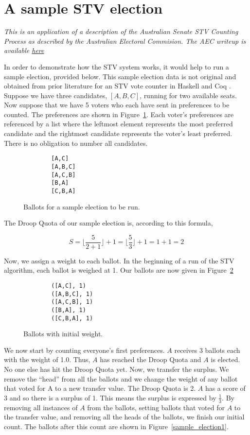 \section{A sample STV election}
\textit{This is an application of a description of the Australian Senate STV
Counting Process as described by the Australian Electoral Commision. The AEC
writeup is available
\href{https://www.aec.gov.au/Voting/counting/senate_count.htm}{here}}

In order to demonstrate how the STV system works, it would help to run a sample
election, provided below. This sample election data is not original and obtained
from prior literature for an STV vote counter in Haskell and Coq
\cite{stv_haskell}. Suppose we have three candidates, $[A, B, C]$, running for
two available seats. Now suppose that we have 5 voters who each have sent in
preferences to be counted. The preferences are shown in
Figure~\ref{sample_election}. Each voter's preferences are referenced by a list
where the leftmost element represents the most preferred candidate and the
rightmost candidate represents the voter's least preferred. There is no
obligation to number all candidates. 


\begin{figure}[ht!!!!!!!!]
    \caption{Ballots for a sample election to be run. }
    \label{sample_election}
    \begin{lstlisting}
        [A,C]
        [A,B,C]
        [A,C,B]
        [B,A]
        [C,B,A]
    \end{lstlisting}
\end{figure}

The Droop Quota of our sample election is, according to this formula, 

$$
S = \lfloor\frac{5}{2 + 1}\rfloor + 1 = \lfloor\frac{5}{3}\rfloor + 1 = 1 + 1 = 2
$$

Now, we assign a weight to each ballot. In the beginning of a run of the STV
algorithm, each ballot is weighed at 1. Our ballots are now given in
Figure~\ref{sample_election0}

\begin{figure}[ht!!!!!!!!]
    \caption{Ballots with initial weight.}
    \label{sample_election0}
    \begin{lstlisting}
        ([A,C], 1)
        ([A,B,C], 1)
        ([A,C,B], 1)
        ([B,A], 1)
        ([C,B,A], 1)
    \end{lstlisting}
\end{figure}

We now start by counting everyone's first preferences. $A$ receives 3 ballots
each with the weight of 1.0. Thus, $A$ has reached the Droop Quota and $A$ is
elected. No one else has hit the Droop Quota yet. Now, we transfer the surplus.
We remove the ``head'' from all the ballots and we change the weight of any
ballot that voted for A to a new transfer value. The Droop Quota is 2. $A$ has a
score of 3 and so there is a surplus of 1. This means the surplus is expressed
by $\frac{1}{3}$. By removing all instances of $A$ from the ballots, setting
ballots that voted for $A$ to the transfer value, and removing all the heads of
the ballots, we finish our initial count. The ballots after this count are shown
in Figure~\ref{sample_election1}. 

